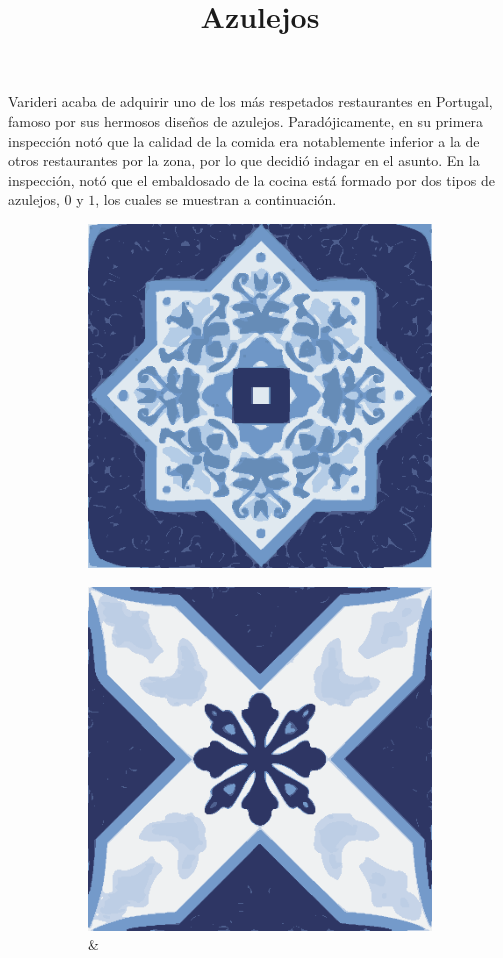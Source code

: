 \documentclass{oci}
\title{Azulejos}
\begin{document}
\begin{problemDescription}
Varideri acaba de adquirir uno de los más respetados restaurantes en Portugal,
famoso por sus hermosos diseños de azulejos.
Paradójicamente, en su primera inspección notó que la calidad de la comida era
notablemente inferior a la de otros restaurantes por la zona, por lo que decidió
indagar en el asunto.
En la inspección, notó que el embaldosado de la cocina está formado por dos
tipos de azulejos, $0$ y $1$, los cuales se muestran a continuación.

\begin{figure}[h]
  \centering
  \begin{subfigure}{0.4\textwidth}
    \centering
    \includegraphics[scale=0.3]{a.eps}
  \end{subfigure}
  \begin{subfigure}{0.4\textwidth}
    \centering
    \includegraphics[scale=0.3]{b.eps} &
  \end{subfigure}
\end{figure}


\end{problemDescription}
\end{document}
